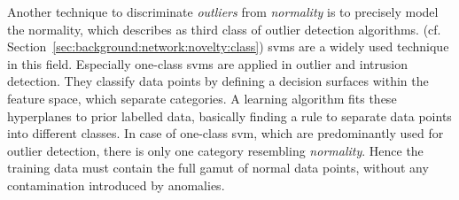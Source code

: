 Another technique to discriminate \emph{outliers} from \emph{normality} is to precisely model the normality, which \textcite{Hodge2004} describes as third class of outlier detection algorithms. (cf. Section~\ref{sec:background:network:novelty:class})
\glspl{svm} are a widely used technique in this field. Especially one-class \glspl{svm} are applied in outlier and intrusion detection. \parencite[cf.][]{Lazarevic2003,Eskin2002}
They classify data points by defining a decision surfaces within the feature space, which separate categories. A learning algorithm fits these hyperplanes to prior labelled data, basically finding a rule to separate data points into different classes. 
In case of one-class \gls{svm}, which are predominantly used for outlier detection, there is only one category resembling \emph{normality}. Hence the training data must contain the full gamut of normal data points, without any contamination introduced by anomalies. \parencite[cf.][]{Muller2001,Scholkopf2001a}

